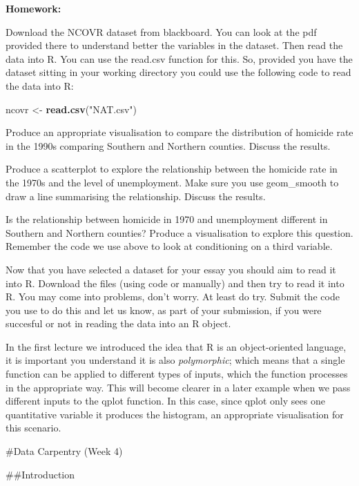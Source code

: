\documentclass[]{book}
\newenvironment{Shaded}{\begin{snugshade}}{\end{snugshade}}
\newcommand{\KeywordTok}[1]{\textcolor[rgb]{0.13,0.29,0.53}{\textbf{#1}}}
\newcommand{\NormalTok}[1]{#1}
\newcommand{\StringTok}[1]{\textcolor[rgb]{0.31,0.60,0.02}{#1}}
\theoremstyle{definition}
\theoremstyle{definition}
\theoremstyle{definition}
\theoremstyle{remark}
\begin{document}
\textbf{Homework:}

Download the NCOVR dataset from blackboard. You can look at the pdf
provided there to understand better the variables in the dataset. Then
read the data into R. You can use the read.csv function for this. So,
provided you have the dataset sitting in your working directory you
could use the following code to read the data into R:

\begin{Shaded}
\begin{Highlighting}[]
\NormalTok{ncovr <-}\StringTok{ }\KeywordTok{read.csv}\NormalTok{(}\StringTok{"NAT.csv"}\NormalTok{)}
\end{Highlighting}
\end{Shaded}

Produce an appropriate visualisation to compare the distribution of
homicide rate in the 1990s comparing Southern and Northern counties.
Discuss the results.

Produce a scatterplot to explore the relationship between the homicide
rate in the 1970s and the level of unemployment. Make sure you use
geom\_smooth to draw a line summarising the relationship. Discuss the
results.

Is the relationship between homicide in 1970 and unemployment different
in Southern and Northern counties? Produce a visualisation to explore
this question. Remember the code we use above to look at conditioning on
a third variable.

Now that you have selected a dataset for your essay you should aim to
read it into R. Download the files (using code or manually) and then try
to read it into R. You may come into problems, don't worry. At least do
try. Submit the code you use to do this and let us know, as part of your
submission, if you were succesful or not in reading the data into an R
object.

In the first lecture we introduced the idea that R is an object-oriented
language, it is important you understand it is also \emph{polymorphic};
which means that a single function can be applied to different types of
inputs, which the function processes in the appropriate way. This will
become clearer in a later example when we pass different inputs to the
qplot function. In this case, since qplot only sees one quantitative
variable it produces the histogram, an appropriate visualisation for
this scenario.

\#Data Carpentry (Week 4)

\#\#Introduction
\end{document}
